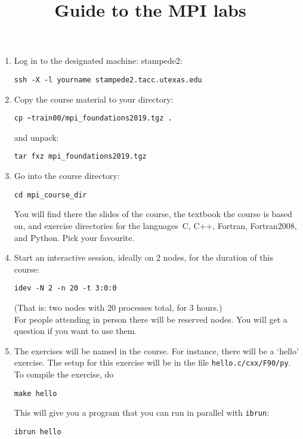 \documentclass[11pt]{artikel3}
\begin{document}
\title{Guide to the MPI labs}
\author{}\date{}
\maketitle

\begin{enumerate}
\item Log in to the designated machine: stampede2:
\begin{verbatim}
ssh -X -l yourname stampede2.tacc.utexas.edu
\end{verbatim}
\item Copy the course material to your directory:
\begin{verbatim}
cp ~train00/mpi_foundations2019.tgz .
\end{verbatim}
and unpack:
\begin{verbatim}
tar fxz mpi_foundations2019.tgz
\end{verbatim}
\item Go into the course directory:
\begin{verbatim}
cd mpi_course_dir
\end{verbatim}
You will find there the slides of the course, the textbook the course
is based on, and exercise directories for the languages~C, C++,
Fortran, Fortran2008, and Python. Pick your favourite.
\item Start an interactive session, ideally on 2 nodes, for the
  duration of this course:
\begin{verbatim}
idev -N 2 -n 20 -t 3:0:0
\end{verbatim}
(That is: two nodes with 20 processes total, for 3 hours.)\\
For people attending in person there will be reserved nodes. You will
get a question if you want to use them.
\item The exercises will be named in the course. For instance, there
  will be a `hello' exercise. The setup for this exercise will be in
  the file \texttt{hello.c/cxx/F90/py}. To compile the exercise, do
\begin{verbatim}
make hello
\end{verbatim}
This will give you a program that you can run in parallel with \texttt{ibrun}:
\begin{verbatim}
ibrun hello
\end{verbatim}
\end{enumerate}
\end{document}
